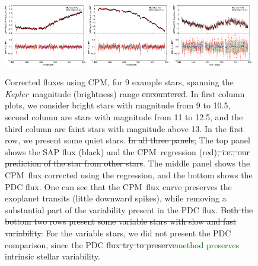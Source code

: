 \documentclass[12pt, preprint]{aastex}
\newcommand{\project}[1]{\textsl{#1}}
\newcommand{\Kepler}{\project{Kepler}}
\newcommand{\name}{CPM}
\newcommand{\revise}[1]{\textcolor{darkgreen}{#1}}
\newcommand{\remove}[1]{\sout{#1}}
\begin{document}
\begin{figure}[p]
\begin{center}
\includegraphics[width=0.32\textwidth]{f5j}
\hfill
\includegraphics[width=0.32\textwidth]{f5k}
\hfill
\includegraphics[width=0.32\textwidth]{f5l}
\end{center}

\caption{
  \label{fluxes} 
  Corrected fluxes using \name, for 9 example stars, spanning the \Kepler\ magnitude (brightness) range \remove{encountered}. 
  In first column plots, we consider bright stars with magnitude from 9 to 10.5, second column are stars with magnitude from 11 to 12.5, and the third column are faint stars with magnitude above 13. 
  In the first row, we present some quiet stars. 
  \remove{In all three panels,} The top panel shows the SAP flux (black) and the \name\ regression (red)\remove{, i.e., our prediction of the star from other stars}. 
  The middle panel shows the \name\ flux corrected using the regression, and the bottom shows the PDC flux. 
  One can see that the \name\ flux curve preserves the exoplanet transits (little downward spikes), 
    while removing a substantial part of the variability present in the PDC flux. 
  \remove{Both the bottom two rows present some variable stars with slow and fast variability.} 
  For the variable stars, we did not present the PDC comparison, 
    since the PDC \remove{flux try to preserve}\revise{method preserves} intrinsic stellar variability.}
\end{figure}
\end{document}
